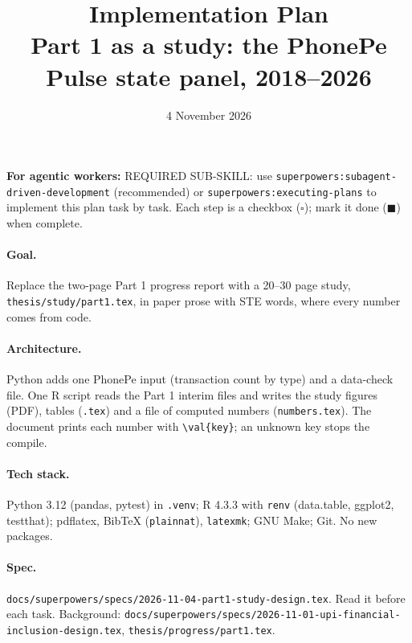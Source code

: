 \documentclass[10pt,a4paper]{article}
\title{Implementation Plan\\[2pt]\large Part 1 as a study: the PhonePe Pulse state panel, 2018--2026}
\date{4 November 2026}
\newcommand{\f}[1]{\texttt{#1}}
\begin{document}
\maketitle

\noindent\textbf{For agentic workers:} REQUIRED SUB-SKILL: use \f{superpowers:subagent-driven-development}
(recommended) or \f{superpowers:executing-plans} to implement this plan task by task. Each step is a
checkbox ($\square$); mark it done ($\blacksquare$) when complete.

\paragraph{Goal.} Replace the two-page Part 1 progress report with a 20--30 page study,
\f{thesis/study/part1.tex}, in paper prose with STE words, where every number comes from code.

\paragraph{Architecture.} Python adds one PhonePe input (transaction count by type) and a data-check file.
One R script reads the Part 1 interim files and writes the study figures (PDF), tables (\f{.tex}) and a file
of computed numbers (\f{numbers.tex}). The document prints each number with \verb|\val{key}|; an unknown
key stops the compile.

\paragraph{Tech stack.} Python 3.12 (pandas, pytest) in \f{.venv}; R 4.3.3 with \f{renv} (data.table,
ggplot2, testthat); pdflatex, BibTeX (\f{plainnat}), \f{latexmk}; GNU Make; Git. No new packages.

\paragraph{Spec.} \f{docs/superpowers/specs/2026-11-04-part1-study-design.tex}. Read it before each task.
Background: \f{docs/superpowers/specs/2026-11-01-upi-financial-inclusion-design.tex},
\f{thesis/progress/part1.tex}.
\end{document}
